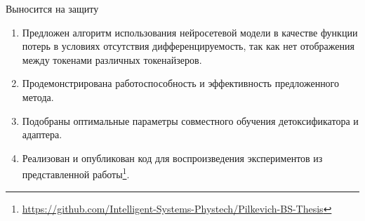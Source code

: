 \documentclass[12pt, fleqn, xcolor=x11names, xcolor=table, aspectratio=169]{beamer}
\begin{document}
\begin{frame}{Выносится на защиту}

\begin{enumerate}
    \item Предложен алгоритм использования нейросетевой модели в качестве функции потерь в условиях отсутствия дифференцируемость, так как нет отображения между токенами различных токенайзеров.
    
    \item Продемонстрирована работоспособность и эффективность предложенного метода. 
    
    \item Подобраны оптимальные параметры совместного обучения детоксификатора и адаптера. 
    
    \item Реализован и опубликован код для воспроизведения экспериментов из представленной работы\footnote{\url{https://github.com/Intelligent-Systems-Phystech/Pilkevich-BS-Thesis}}.
    
\end{enumerate}

\end{frame}

\end{document}
